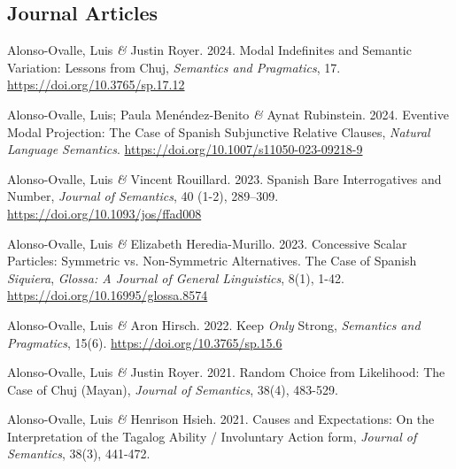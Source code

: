 \documentclass[11pt]{article}
\begin{document}
\subsection*{Journal Articles}

Alonso-Ovalle, Luis \textit{\&} Justin Royer. 2024. Modal Indefinites and Semantic Variation: Lessons from Chuj, \textit{Semantics and Pragmatics}, 17. \href{https://doi.org/10.3765/sp.17.12}{https://doi.org/10.3765/sp.17.12}


Alonso-Ovalle, Luis; Paula Men\'endez-Benito \textit{\&} Aynat Rubinstein. 2024. Eventive Modal Projection: The Case of Spanish Subjunctive Relative Clauses, \textit{Natural Language Semantics}. \href{https://doi.org/10.1007/s11050-023-09218-9}{https://doi.org/10.1007/s11050-023-09218-9}


Alonso-Ovalle, Luis \textit{\&} Vincent Rouillard. 2023. Spanish Bare Interrogatives and Number, \textit{Journal of Semantics}, 40 (1-2), 289--309. \href{https://doi.org/10.1093/jos/ffad008}{https://doi.org/10.1093/jos/ffad008}


Alonso-Ovalle, Luis \textit{\&} Elizabeth Heredia-Murillo. 2023. Concessive Scalar Particles:
Symmetric vs. Non-Symmetric Alternatives.
The Case of Spanish \textit{Siquiera}, \textit{Glossa: A Journal of General Linguistics}, 8(1), 1-42. \href{https://doi.org/10.16995/glossa.8574}{https://doi.org/10.16995/glossa.8574}

 
Alonso-Ovalle, Luis \textit{\&} Aron Hirsch. 2022. Keep \textit{Only} Strong,  \textit{Semantics and Pragmatics}, 15(6). \href{https://doi.org/10.3765/sp.15.6}{https://doi.org/10.3765/sp.15.6}

Alonso-Ovalle, Luis \textit{\&} Justin Royer. 2021. Random Choice from Likelihood: The Case of Chuj (Mayan), \textit{Journal of Semantics}, 38(4), 483-529. 


Alonso-Ovalle, Luis \textit{\&} Henrison Hsieh. 2021. Causes and Expectations: On the Interpretation of the Tagalog Ability / Involuntary Action form, \textit{Journal of Semantics}, 38(3), 441-472.%
\end{document}
